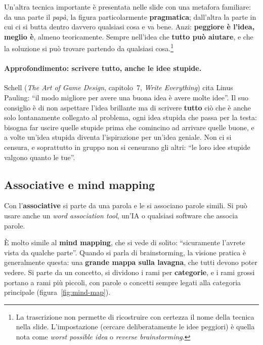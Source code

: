 Un'altra tecnica importante è presentata nelle slide con una metafora
familiare: da una parte il \emph{papà}, la figura particolarmente
\textbf{pragmatica}; dall'altra la parte in cui ci si butta dentro davvero
qualsiasi cosa e va bene. Anzi: \textbf{peggiore è l'idea, meglio è},
almeno teoricamente. Sempre nell'idea che \textbf{tutto può aiutare}, e che
la soluzione si può trovare partendo da qualsiasi cosa.\footnote{La
trascrizione non permette di ricostruire con certezza il nome della tecnica
nella slide. L'impostazione (cercare deliberatamente le idee peggiori) è
quella nota come \emph{worst possible idea} o \emph{reverse brainstorming}.}

\paragraph{Approfondimento: scrivere tutto, anche le idee stupide.} Schell
(\emph{The Art of Game Design}, capitolo~7, \emph{Write Everything}) cita
Linus Pauling: ``il modo migliore per avere una buona idea è avere molte
idee''. Il suo consiglio è di non aspettare l'idea brillante ma di scrivere
\textbf{tutto} ciò che è anche solo lontanamente collegato al problema, ogni
idea stupida che passa per la testa: bisogna far uscire quelle stupide prima
che comincino ad arrivare quelle buone, e a volte un'idea stupida diventa
l'ispirazione per un'idea geniale. Non ci si censura, e soprattutto in
gruppo non si censurano gli altri: ``le loro idee stupide valgono quanto le
tue''.

\subsection{Associative e mind mapping}

Con l'\textbf{associative} si parte da una parola e le si associano parole
simili. Si può usare anche un \emph{word association tool}, un'IA o
qualsiasi software che associa parole.

È molto simile al \textbf{mind mapping}, che si vede di solito: ``sicuramente
l'avrete vista da qualche parte''. Quando si parla di brainstorming, la
visione pratica è generalmente questa: una \textbf{grande mappa sulla
lavagna}, che tutti devono poter vedere. Si parte da un concetto, si
dividono i rami per \textbf{categorie}, e i rami grossi portano a rami più
piccoli, con parole o concetti sempre legati alla categoria principale
(figura~\ref{fig:mind-map}).


